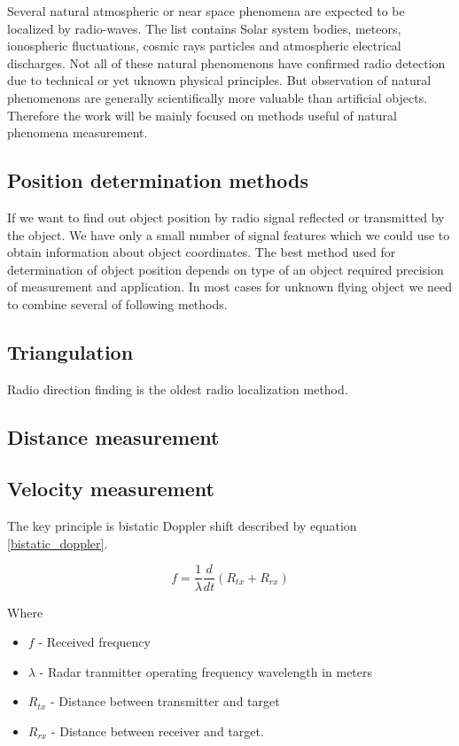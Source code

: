 \documentclass[twoside]{ctuthesis}
\theoremstyle{plain}
\theoremstyle{definition}
\theoremstyle{note}
\begin{document}
Several natural atmospheric or near space phenomena are expected to be localized by radio-waves. The list contains Solar system bodies, meteors, ionospheric fluctuations, cosmic rays particles and atmospheric electrical discharges. Not all of these natural phenomenons have confirmed radio detection due to technical or yet uknown physical principles. But observation of natural phenomenons are generally scientifically more valuable than artificial objects. Therefore the work will be mainly focused on methods useful of natural phenomena measurement. 

\subsection{Position determination methods}

If we want to find out object position by radio signal reflected or transmitted by the object. We have only a small number of signal features which we could use to obtain information about object coordinates. The best method used for determination of object position depends on type of an object required precision of measurement and application. In most cases for unknown flying object we need to combine several of following methods. 

\subsection{Triangulation}

Radio direction finding is the oldest radio localization method. 

\subsection{Distance measurement}


\subsection{Velocity measurement}


The key principle is bistatic Doppler shift described by equation \ref{bistatic_doppler}. 

\begin{equation}
f = \frac{1}{\lambda} \frac{d}{dt} \left( R_{tx} + R_{rx} \right)
\label{bistatic_doppler}
\end{equation}

Where 
\begin{itemize}
\item $f$ - Received frequency
\item $\lambda$ - Radar tranmitter operating frequency wavelength in meters
\item $R_{tx}$ - Distance between transmitter and target
\item $R_{rx}$ - Distance between receiver and target.
\end{itemize}
\end{document}
